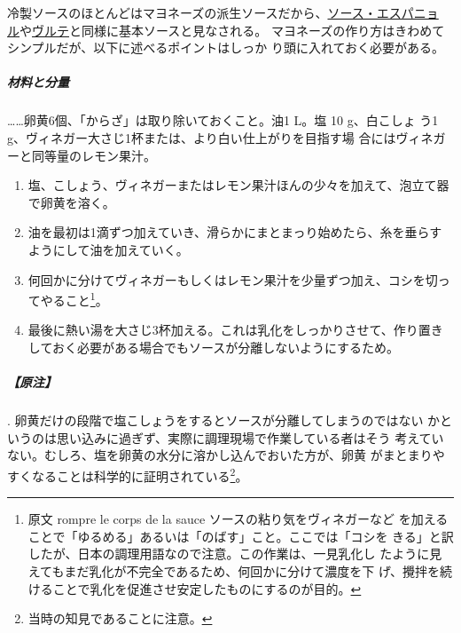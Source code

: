\begin{recette}


冷製ソースのほとんどはマヨネーズの派生ソースだから、\protect\hyperlink{sauce-espagnole}{ソース・エスパニョ
ル}や\protect\hyperlink{veloute}{ヴルテ}と同様に基本ソースと見なされる。
マヨネーズの作り方はきわめてシンプルだが、以下に述べるポイントはしっか
り頭に入れておく必要がある。

\hypertarget{proportions-mayonnaise}{%
\subparagraph{材料と分量}\label{proportions-mayonnaise}}

\ldots{}\ldots{}卵黄6個、「からざ」は取り除いておくこと。油1 L。塩 10
g、白こしょ う1
g、ヴィネガー大さじ1\undemi{}杯または、より白い仕上がりを目指す場
合にはヴィネガーと同等量のレモン果汁。

\begin{enumerate}
\def\labelenumi{\arabic{enumi}.}
\item
  塩、こしょう、ヴィネガーまたはレモン果汁ほんの少々を加えて、泡立て器で卵黄を溶く。
\item
  油を最初は1滴ずつ加えていき、滑らかにまとまっり始めたら、糸を垂らすようにして油を加えていく。
\item
  何回かに分けてヴィネガーもしくはレモン果汁を少量ずつ加え、コシを切ってやること\footnote{原文
    rompre le corps de la sauce ソースの粘り気をヴィネガーなど
    を加えることで「ゆるめる」あるいは「のばす」こと。ここでは「コシを
    きる」と訳したが、日本の調理用語なので注意。この作業は、一見乳化し
    たように見えてもまだ乳化が不完全であるため、何回かに分けて濃度を下
    げ、攪拌を続けることで乳化を促進させ安定したものにするのが目的。}。
\item
  最後に熱い湯を大さじ3杯加える。これは乳化をしっかりさせて、作り置きしておく必要がある場合でもソースが分離しないようにするため。
\end{enumerate}

\hypertarget{nota-mayonnaise}{%
\subparagraph{【原注】}\label{nota-mayonnaise}}

.
卵黄だけの段階で塩こしょうをするとソースが分離してしまうのではない
かというのは思い込みに過ぎず、実際に調理現場で作業している者はそう
考えていない。むしろ、塩を卵黄の水分に溶かし込んでおいた方が、卵黄
がまとまりやすくなることは科学的に証明されている\footnote{当時の知見であることに注意。}。


\end{recette}
